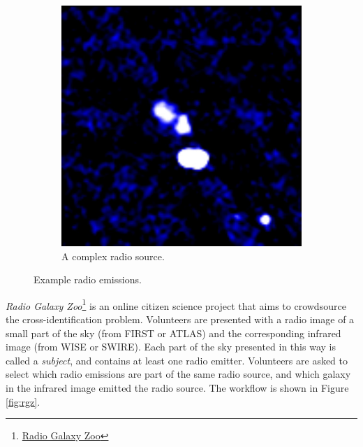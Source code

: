 \documentclass[a4paper]{article}
\newcommand{\fig}{Figure }
\begin{document}
\begin{figure}[!ht]
\begin{subfigure}{0.3\textwidth}
            \includegraphics[width=\linewidth]{images/ARG00012vh_radio.jpg}
            \caption{A complex radio source.}
            \label{fig:complex-source}
          \end{subfigure}
          \caption{Example radio emissions.}
      \end{figure}

      \emph{Radio Galaxy Zoo}\footnote{\href{http://radio.galaxyzoo.org/}{Radio Galaxy Zoo}} is an online citizen science project that aims to crowdsource the cross-identification problem\cite{banfield15}. Volunteers are presented with a radio image of a small part of the sky (from FIRST or ATLAS) and the corresponding infrared image (from WISE or SWIRE). Each part of the sky presented in this way is called a \emph{subject}, and contains at least one radio emitter. Volunteers are asked to select which radio emissions are part of the same radio source, and which galaxy in the infrared image emitted the radio source. The workflow is shown in \fig \ref{fig:rgz}.
\end{document}
